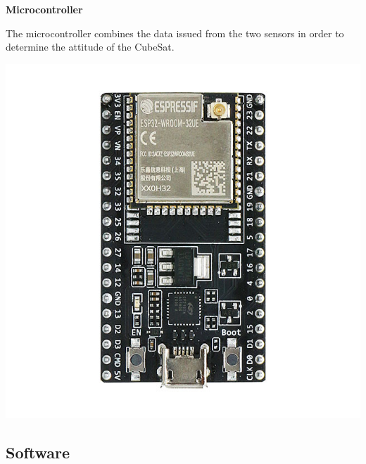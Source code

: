 \documentclass[a4paper, 12pt]{article}
\begin{document}
\begin{minipage}{0.55\textwidth}
\textbf{Microcontroller} 

The microcontroller combines the data issued from the two sensors in order to determine the attitude of the CubeSat.

\end{minipage}
\hfill
\begin{minipage}{0.4\textwidth}
    \centering
    \includegraphics[width=0.5\linewidth]{fig/ESP32.jpg}
    \label{fig:Microcontroller}
\end{minipage}

\subsection{Software}
\end{document}
